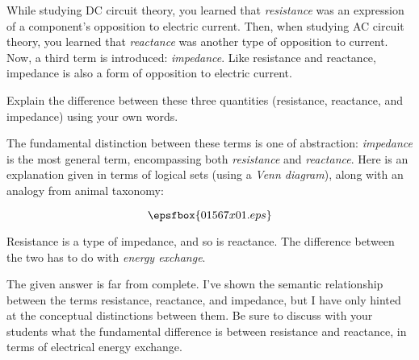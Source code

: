 

While studying DC circuit theory, you learned that {\it resistance} was an expression of a component's opposition to electric current.  Then, when studying AC circuit theory, you learned that {\it reactance} was another type of opposition to current.  Now, a third term is introduced: {\it impedance}.  Like resistance and reactance, impedance is also a form of opposition to electric current.

Explain the difference between these three quantities (resistance, reactance, and impedance) using your own words.







The fundamental distinction between these terms is one of abstraction: {\it impedance} is the most general term, encompassing both {\it resistance} and {\it reactance}.  Here is an explanation given in terms of logical sets (using a {\it Venn diagram}), along with an analogy from animal taxonomy:

$$\epsfbox{01567x01.eps}$$

Resistance is a type of impedance, and so is reactance.  The difference between the two has to do with {\it energy exchange}.







The given answer is far from complete.  I've shown the semantic relationship between the terms resistance, reactance, and impedance, but I have only hinted at the conceptual distinctions between them.  Be sure to discuss with your students what the fundamental difference is between resistance and reactance, in terms of electrical energy exchange.




